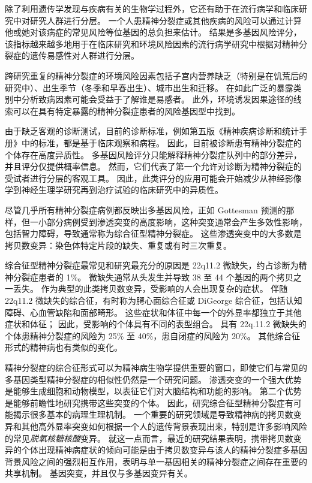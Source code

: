 除了利用遗传学发现与疾病有关的生物学过程外，它还有助于在流行病学和临床研究中对研究人群进行分层。
一个人患精神分裂症或其他疾病的风险可以通过计算他或她对该病症的常见风险等位基因的总负担来估计。
结果是多基因风险评分，该指标越来越多地用于在临床研究和环境风险因素的流行病学研究中根据对精神分裂症的遗传易感性对人群进行分层。


跨研究重复的精神分裂症的环境风险因素包括子宫内营养缺乏（特别是在饥荒后的研究中）、出生季节（冬季和早春出生）、城市出生和迁移。
在如此广泛的暴露类别中分析致病因素可能会受益于了解谁是易感者。
此外，环境诱发因果途径的线索可以在具有特定暴露的精神分裂症患者的风险基因型中找到。


由于缺乏客观的诊断测试，目前的诊断标准，例如第五版《精神疾病诊断和统计手册》中的标准，都是基于临床观察和病程。
因此，目前被诊断患有精神分裂症的个体存在高度异质性。
多基因风险评分只能解释精神分裂症队列中的部分差异，并且评分仅提供概率信息。
然而，它们代表了第一个允许对诊断为精神分裂症的受试者进行分层的客观工具。
因此，此类评分的应用可能会开始减少从神经影像学到神经生理学研究再到治疗试验的临床研究中的异质性。


尽管几乎所有精神分裂症病例都反映出多基因风险，正如 Gottesman 预测的那样，但一小部分病例受到渗透突变的高度影响，这种突变通常会产生多效性影响，包括智力障碍，导致通常称为综合征型精神分裂症。
这些渗透突变中的大多数是拷贝数变异：染色体特定片段的缺失、重复或有时三次重复。


综合征型精神分裂症最常见和研究最充分的原因是 22q11.2 微缺失，约占诊断为精神分裂症患者的 1\%。
微缺失通常从头发生并导致 38 至 44 个基因的两个拷贝之一丢失。
作为典型的此类拷贝数变异，受影响的人会出现复杂的症状。
伴随 22q11.2 微缺失的综合征，有时称为腭心面综合征或 DiGeorge 综合征，包括认知障碍、心血管缺陷和面部畸形。
这些症状和体征中每一个的外显率都独立于其他症状和体征；
因此，受影响的个体具有不同的表型组合。
具有 22q.11.2 微缺失的个体患精神分裂症的风险为 25\% 至 40\%，患自闭症的风险为 20\%。
其他综合征形式的精神病也有类似的变化。


精神分裂症的综合征形式可以为精神病生物学提供重要的窗口，即使它们与常见的多基因类型精神分裂症的相似性仍然是一个研究问题。
渗透突变的一个强大优势是能够生成细胞和动物模型，以表征它们对大脑结构和功能的影响。
第二个优势是能够前瞻性地研究携带这些突变的个体。
因此，研究综合征型精神分裂症有可能揭示很多基本的病理生理机制。
一个重要的研究领域是导致精神病的拷贝数变异和其他高外显率突变如何根据一个人的遗传背景表现出来，特别是许多影响风险的常见\textit{脱氧核糖核酸}变异。
就这一点而言，最近的研究结果表明，携带拷贝数变异的个体出现精神病症状的倾向可能是由于拷贝数变异与该人的精神分裂症多基因背景风险之间的强烈相互作用，表明与单一基因相关的精神分裂症之间存在重要的共享机制。
基因突变，并且仅与多基因变异有关。



